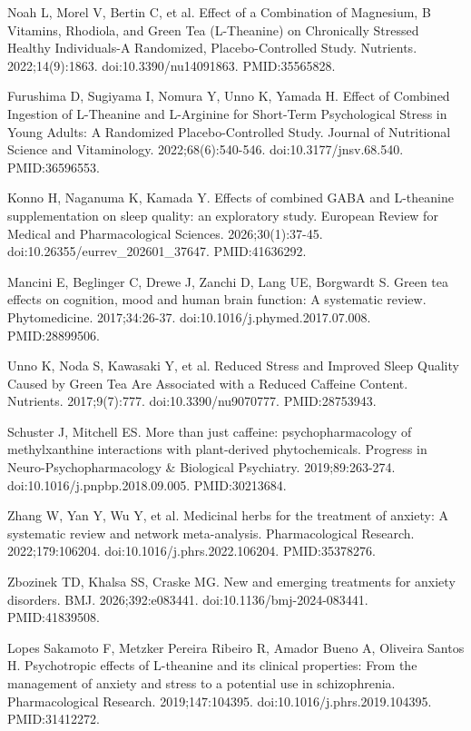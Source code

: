 \documentclass[12pt,oneside]{book}
\newcommand{\reff}[2]{\par\hangindent=7mm\hangafter=1\noindent[#1]\hspace{2mm}#2\par}
\begin{document}
\reff{61}{Noah L, Morel V, Bertin C, et al. Effect of a Combination of Magnesium, B Vitamins, Rhodiola, and Green Tea (L-Theanine) on Chronically Stressed Healthy Individuals-A Randomized, Placebo-Controlled Study. Nutrients. 2022;14(9):1863. doi:10.3390/nu14091863. PMID:35565828.}

\reff{62}{Furushima D, Sugiyama I, Nomura Y, Unno K, Yamada H. Effect of Combined Ingestion of L-Theanine and L-Arginine for Short-Term Psychological Stress in Young Adults: A Randomized Placebo-Controlled Study. Journal of Nutritional Science and Vitaminology. 2022;68(6):540-546. doi:10.3177/jnsv.68.540. PMID:36596553.}

\reff{63}{Konno H, Naganuma K, Kamada Y. Effects of combined GABA and L-theanine supplementation on sleep quality: an exploratory study. European Review for Medical and Pharmacological Sciences. 2026;30(1):37-45. doi:10.26355/eurrev\_202601\_37647. PMID:41636292.}

\reff{64}{Mancini E, Beglinger C, Drewe J, Zanchi D, Lang UE, Borgwardt S. Green tea effects on cognition, mood and human brain function: A systematic review. Phytomedicine. 2017;34:26-37. doi:10.1016/j.phymed.2017.07.008. PMID:28899506.}

\reff{65}{Unno K, Noda S, Kawasaki Y, et al. Reduced Stress and Improved Sleep Quality Caused by Green Tea Are Associated with a Reduced Caffeine Content. Nutrients. 2017;9(7):777. doi:10.3390/nu9070777. PMID:28753943.}

\reff{66}{Schuster J, Mitchell ES. More than just caffeine: psychopharmacology of methylxanthine interactions with plant-derived phytochemicals. Progress in Neuro-Psychopharmacology \& Biological Psychiatry. 2019;89:263-274. doi:10.1016/j.pnpbp.2018.09.005. PMID:30213684.}

\reff{67}{Zhang W, Yan Y, Wu Y, et al. Medicinal herbs for the treatment of anxiety: A systematic review and network meta-analysis. Pharmacological Research. 2022;179:106204. doi:10.1016/j.phrs.2022.106204. PMID:35378276.}

\reff{68}{Zbozinek TD, Khalsa SS, Craske MG. New and emerging treatments for anxiety disorders. BMJ. 2026;392:e083441. doi:10.1136/bmj-2024-083441. PMID:41839508.}

\reff{69}{Lopes Sakamoto F, Metzker Pereira Ribeiro R, Amador Bueno A, Oliveira Santos H. Psychotropic effects of L-theanine and its clinical properties: From the management of anxiety and stress to a potential use in schizophrenia. Pharmacological Research. 2019;147:104395. doi:10.1016/j.phrs.2019.104395. PMID:31412272.}
\end{document}

